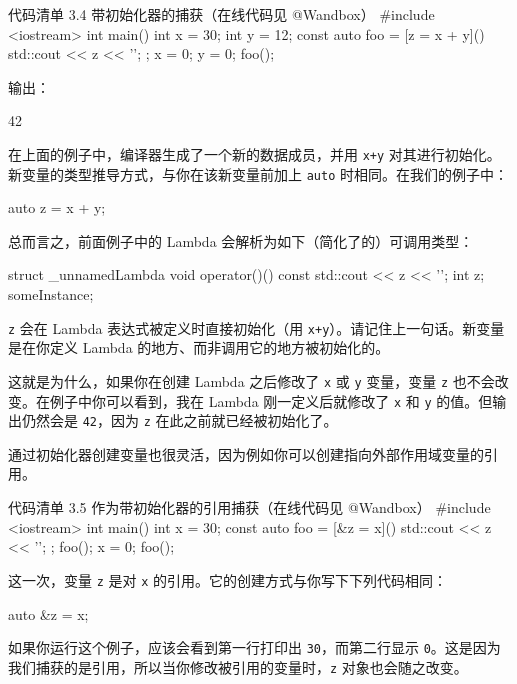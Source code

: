 \begin{codeboxt}{代码清单 3.4 带初始化器的捕获（在线代码见 @Wandbox）}
#include <iostream>
int main() {
int x = 30;
int y = 12;
const auto foo = [z = x + y]() { std::cout << z << '\n'; };
x = 0;
y = 0;
foo();
}
\end{codeboxt}

输出：

\begin{codebox}
42
\end{codebox}

在上面的例子中，编译器生成了一个新的数据成员，并用 \texttt{x+y} 对其进行初始化。新变量的类型推导方式，与你在该新变量前加上 \texttt{auto} 时相同。在我们的例子中：

\begin{codebox}
auto z = x + y;
\end{codebox}

总而言之，前面例子中的 Lambda 会解析为如下（简化了的）可调用类型：

\begin{codebox}
struct _unnamedLambda {
void operator()() const {
std::cout << z << '\n';
}
int z;
} someInstance;
\end{codebox}

\texttt{z} 会在 Lambda 表达式被定义时直接初始化（用 \texttt{x+y}）。请记住上一句话。新变量是在你定义 Lambda 的地方、而非调用它的地方被初始化的。

这就是为什么，如果你在创建 Lambda 之后修改了 \texttt{x} 或 \texttt{y} 变量，变量 \texttt{z} 也不会改变。在例子中你可以看到，我在 Lambda 刚一定义后就修改了 \texttt{x} 和 \texttt{y} 的值。但输出仍然会是 \texttt{42}，因为 \texttt{z} 在此之前就已经被初始化了。

通过初始化器创建变量也很灵活，因为例如你可以创建指向外部作用域变量的引用。

\begin{codeboxt}{代码清单 3.5 作为带初始化器的引用捕获（在线代码见 @Wandbox）}
#include <iostream>
int main() {
int x = 30;
const auto foo = [&z = x]() { std::cout << z << '\n'; };
foo();
x = 0;
foo();
}
\end{codeboxt}

这一次，变量 \texttt{z} 是对 \texttt{x} 的引用。它的创建方式与你写下下列代码相同：

\begin{codebox}
auto &z = x;
\end{codebox}

如果你运行这个例子，应该会看到第一行打印出 \texttt{30}，而第二行显示 \texttt{0}。这是因为我们捕获的是引用，所以当你修改被引用的变量时，\texttt{z} 对象也会随之改变。

